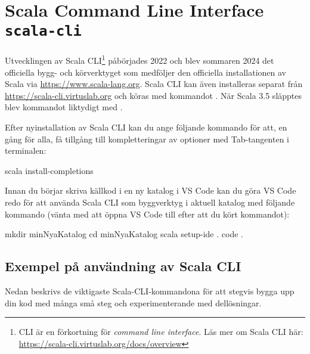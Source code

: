 \section{Scala Command Line Interface \texttt{scala-cli}}\label{appendix:build:scala-cli}

Utvecklingen av Scala CLI\footnote{CLI är en förkortning för \textit{command line interface}. Läs mer om Scala CLI här: \url{https://scala-cli.virtuslab.org/docs/overview}} påbörjades 2022 och blev sommaren 2024 det officiella bygg- och körverktyget som medföljer den officiella installationen av Scala via \url{https://www.scala-lang.org}. Scala CLI kan även installeras separat från \url{https://scala-cli.virtuslab.org} och köras med kommandot . När Scala 3.5 släpptes blev kommandot  liktydigt med .

Efter nyinstallation av Scala CLI kan du ange följande kommando för att, en gång för alla, få tillgång till kompletteringar av optioner med Tab-tangenten i terminalen:
\begin{REPLsmall}
scala install-completions 
\end{REPLsmall}

Innan du börjar skriva källkod i en ny katalog i VS Code kan du göra VS Code redo för att använda Scala CLI som byggverktyg i aktuell katalog med följande kommando (vänta med att öppna VS Code till efter att du kört kommandot): 
\begin{REPLsmall}
mkdir minNyaKatalog
cd minNyaKatalog
scala setup-ide . 
code .
\end{REPLsmall}

\subsection{Exempel på användning av Scala CLI}\label{appendix:build-scala-cli-watch-mode}

Nedan beskrivs de viktigaste Scala-CLI-kommandona för att stegvis bygga upp din kod med många små steg och experimenterande med dellösningar. 

